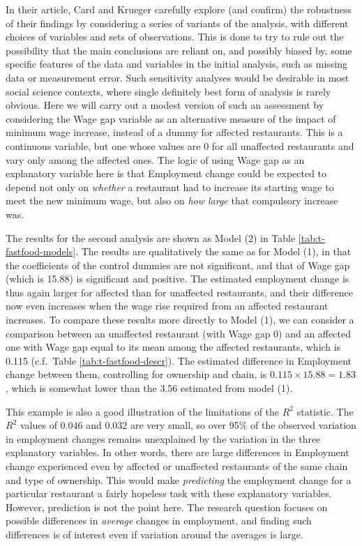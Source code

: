 \documentclass[11pt,a4paper,openany]{book}
\begin{document}
In their article, Card and Krueger carefully explore (and confirm) the
robustness of their findings by considering a series of variants of the
analysis, with different choices of variables and sets of observations.
This is done to try to rule out the possibility that the main
conclusions are reliant on, and possibly biased by, some specific
features of the data and variables in the initial analysis, such as
missing data or measurement error. Such sensitivity analyses would be
desirable in most social science contexts, where single definitely best
form of analysis is rarely obvious. Here we will carry out a modest
version of such an assessment by considering the Wage gap variable as an
alternative measure of the impact of minimum wage increase, instead of a
dummy for affected restaurants. This is a continuous variable, but one
whose values are 0 for all unaffected restaurants and vary only among
the affected ones. The logic of using Wage gap as an explanatory
variable here is that Employment change could be expected to depend not
only on \emph{whether} a restaurant had to increase its starting wage to
meet the new minimum wage, but also on \emph{how large} that compulsory
increase was.

The results for the second analysis are shown as Model (2) in Table
\ref{tab:t-fastfood-models}. The results are qualitatively the same as
for Model (1), in that the coefficients of the control dummies are not
significant, and that of Wage gap (which is 15.88) is significant and
positive. The estimated employment change is thus again larger for
affected than for unaffected restaurants, and their difference now even
increases when the wage rise required from an affected restaurant
increases. To compare these results more directly to Model (1), we can
consider a comparison between an unaffected restaurant (with Wage gap 0)
and an affected one with Wage gap equal to its mean among the affected
restaurants, which is 0.115 (c.f.~Table \ref{tab:t-fastfood-descr}). The
estimated difference in Employment change between them, controlling for
ownership and chain, is \(0.115\times 15.88=1.83\), which is somewhat
lower than the 3.56 estimated from model (1).

This example is also a good illustration of the limitations of the
\(R^{2}\) statistic. The \(R^{2}\) values of 0.046 and 0.032 are very
small, so over 95\% of the observed variation in employment changes
remains unexplained by the variation in the three explanatory variables.
In other words, there are large differences in Employment change
experienced even by affected or unaffected restaurants of the same chain
and type of ownership. This would make \emph{predicting} the employment
change for a particular restaurant a fairly hopeless task with these
explanatory variables. However, prediction is not the point here. The
research question focuses on possible differences in \emph{average}
changes in employment, and finding such differences is of interest even
if variation around the averages is large.
\end{document}
